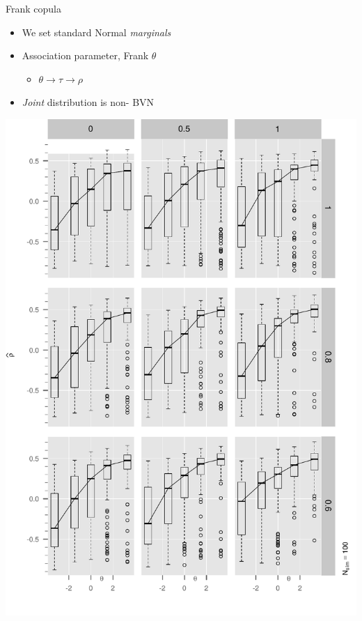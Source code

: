 \documentclass[10pt]{beamer}
\providecommand{\tightlist}{%
\setlength{\itemsep}{0pt}\setlength{\parskip}{0pt}}
\begin{document}
\begin{frame}{Frank copula}
\protect\hypertarget{frank-copula}{}

\begin{itemize}
\tightlist
\item
  We set standard Normal \emph{marginals}
\item
  Association parameter, Frank \(\theta\)

  \begin{itemize}
  \tightlist
  \item
    \(\theta \rightarrow \tau \rightarrow \rho\)
  \end{itemize}
\item
  \emph{Joint} distribution is \alert{non-} BVN
\end{itemize}

\end{frame}

\begin{frame}[fragile]

\begin{center}
  \includegraphics[width=1.00\textwidth]{Figure2/boxplotArray2.pdf}
\end{center}

\end{frame}
\end{document}
